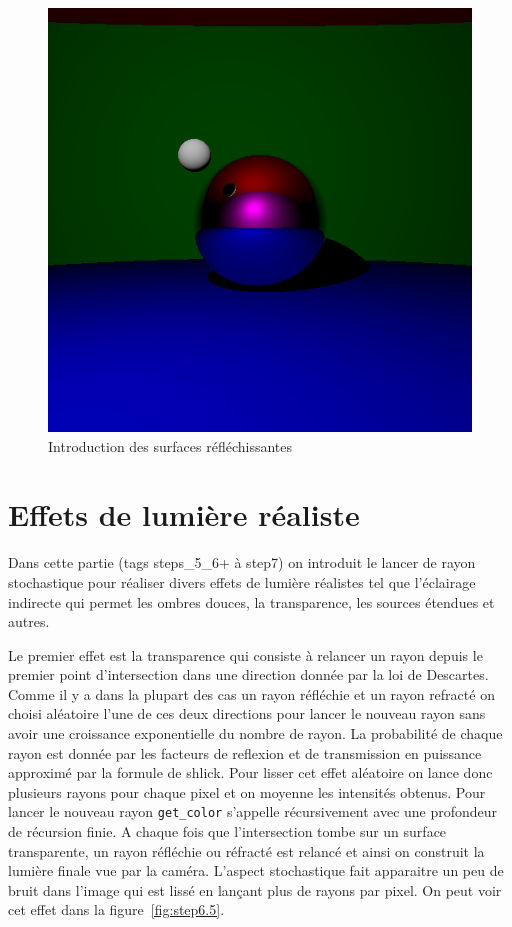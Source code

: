 \documentclass[12pt]{article}
\newcommand\id[1]{\texttt{#1}}
\begin{document}
\begin{figure}[ht]
  \centering
  \includegraphics[width=12cm]{../result/step5}
  \caption{Introduction des surfaces réfléchissantes}\label{fig:step5}
\end{figure}


\section{Effets de lumière réaliste\label{sec:light}}
Dans cette partie (tags steps\_5\_6+ à step7) on introduit le lancer de rayon stochastique pour réaliser divers effets de lumière réalistes tel que l'éclairage indirecte qui permet les ombres douces, la transparence, les sources étendues et autres.

Le premier effet est la transparence qui consiste à relancer un rayon depuis le premier point d'intersection dans une direction donnée par la loi de Descartes.
Comme il y a dans la plupart des cas un rayon réfléchie et un rayon refracté on choisi aléatoire l'une de ces deux directions pour lancer le nouveau rayon sans avoir une croissance exponentielle du nombre de rayon.
La probabilité de chaque rayon est donnée par les facteurs de reflexion et de transmission en puissance approximé par la formule de shlick.
Pour lisser cet effet aléatoire on lance donc plusieurs rayons pour chaque pixel et on moyenne les intensités obtenus.
Pour lancer le nouveau rayon \id{get\_color} s'appelle récursivement avec une profondeur de récursion finie.
A chaque fois que l'intersection tombe sur un surface transparente, un rayon réfléchie ou réfracté est relancé et ainsi on construit la lumière finale vue par la caméra.
L'aspect stochastique fait apparaitre un peu de bruit dans l'image qui est lissé en lançant plus de rayons par pixel.
On peut voir cet effet dans la figure~\ref{fig:step6.5}.
\end{document}
